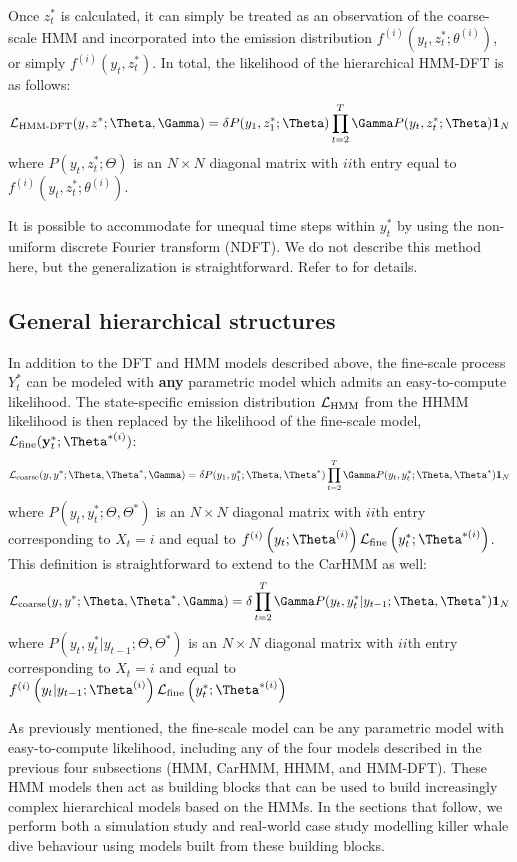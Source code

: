 Once $z^*_t$ is calculated, it can simply be treated as an observation of the coarse-scale HMM and incorporated into the emission distribution $f^{(i)}\left(y_t,z^*_t;\theta^{(i)}\right)$, or simply $f^{(i)}\left(y_t,z^*_t\right)$. In total, the likelihood of the hierarchical HMM-DFT is as follows:
\begin{equation}
\calL_{\text{HMM-DFT}}(y,z^*;\Theta,\Gamma) = \delta P(y_1,z^*_1;\Theta) \prod_{t=2}^T \Gamma P(y_t,z^*_t;\Theta) \mathbf{1}_N
\label{HMMDFT_likelihood}
\end{equation}
where $P(y_t,z^*_t;\Theta)$ is an $N \times N$ diagonal matrix with $ii$th entry equal to $f^{(i)}\left(y_t,z^*_t;\theta^{(i)}\right)$.

It is possible to accommodate for unequal time steps within $y_t^*$ by using the non-uniform discrete Fourier transform (NDFT). We do not describe this method here, but the generalization is straightforward. Refer to \citep{Bagchi:1999} for details.

\subsection{General hierarchical structures}

In addition to the DFT and HMM models described above, the fine-scale process $Y^*_t$ can be modeled with \textbf{any} parametric model which admits an easy-to-compute likelihood. The state-specific emission distribution $\mathcal{L}_{\text{HMM}}$ from the HHMM likelihood is then replaced by the likelihood of the fine-scale model, $\calL_{\text{fine}}(\mathbf{y}^*_t;\Theta^{*(i)})$:
\[
\calL_{\text{coarse}}(y,y^*;\Theta,\Theta^*,\Gamma) = \delta P(y_1,y^*_1;\Theta,\Theta^*) \prod_{t=2}^T \Gamma P(y_t,y^*_t;\Theta,\Theta^*) \mathbf{1}_N
\]
where $P(y_t,y^*_t;\Theta,\Theta^*) $ is an $N \times N$ diagonal matrix with $ii$th entry corresponding to $X_t=i$ and equal to $f^{(i)}\left(y_t;\Theta^{(i)}\right)\calL_{\text{fine}}\left(y^*_t;\Theta^{*(i)}\right)$. This definition is straightforward to extend to the CarHMM as well:
\[
\calL_{\text{coarse}}(y,y^*;\Theta,\Theta^*,\Gamma) = \delta \prod_{t=2}^T \Gamma P(y_t,y^*_t|y_{t-1};\Theta,\Theta^*) \mathbf{1}_N
\]
where $P(y_t,y^*_t|y_{t-1};\Theta,\Theta^*) $ is an $N \times N$ diagonal matrix with $ii$th entry corresponding to $X_t=i$ and equal to $f^{(i)}\left(y_t|y_{t-1};\Theta^{(i)}\right)\calL_{\text{fine}}\left(y^*_t;\Theta^{*(i)}\right)$

As previously mentioned, the fine-scale model can be any parametric model with easy-to-compute likelihood, including any of the four models described in the previous four subsections (HMM, CarHMM, HHMM, and HMM-DFT). These HMM models then act as building blocks that can be used to build increasingly complex hierarchical models based on the HMMs. In the sections that follow, we perform both a simulation study and real-world case study modelling killer whale dive behaviour using models built from these building blocks.